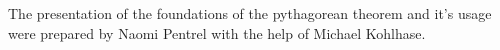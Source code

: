   \begin{omtext}[title=Materials]
    The presentation of the foundations of the pythagorean theorem and it's usage were prepared by Naomi Pentrel with the help of Michael Kohlhase.
  \end{omtext}




